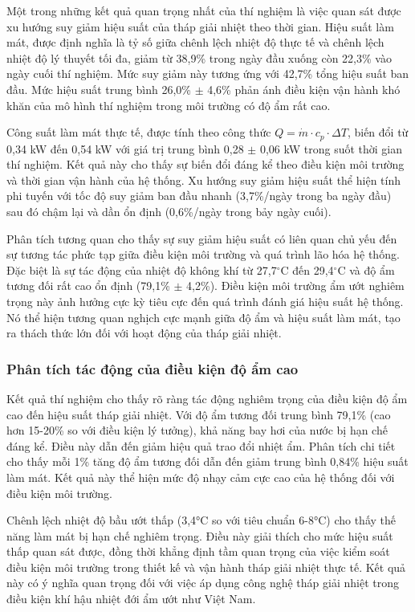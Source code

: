 \documentclass[../main.tex]{subfiles}
\begin{document}
Một trong những kết quả quan trọng nhất của thí nghiệm là việc quan sát được xu hướng suy giảm hiệu suất của tháp giải nhiệt theo thời gian. Hiệu suất làm mát, được định nghĩa là tỷ số giữa chênh lệch nhiệt độ thực tế và chênh lệch nhiệt độ lý thuyết tối đa, giảm từ 38,9\% trong ngày đầu xuống còn 22,3\% vào ngày cuối thí nghiệm. Mức suy giảm này tương ứng với 42,7\% tổng hiệu suất ban đầu. Mức hiệu suất trung bình 26,0\% $\pm$ 4,6\% phản ánh điều kiện vận hành khó khăn của mô hình thí nghiệm trong môi trường có độ ẩm rất cao.

Công suất làm mát thực tế, được tính theo công thức $Q = \dot{m} \cdot c_p \cdot \Delta T$, biến đổi từ 0,34 kW đến 0,54 kW với giá trị trung bình 0,28 $\pm$ 0,06 kW trong suốt thời gian thí nghiệm. Kết quả này cho thấy sự biến đổi đáng kể theo điều kiện môi trường và thời gian vận hành của hệ thống. Xu hướng suy giảm hiệu suất thể hiện tính phi tuyến với tốc độ suy giảm ban đầu nhanh (3,7\%/ngày trong ba ngày đầu) sau đó chậm lại và dần ổn định (0,6\%/ngày trong bảy ngày cuối).

Phân tích tương quan cho thấy sự suy giảm hiệu suất có liên quan chủ yếu đến sự tương tác phức tạp giữa điều kiện môi trường và quá trình lão hóa hệ thống. Đặc biệt là sự tác động của nhiệt độ không khí từ 27,7${^\circ\mathrm{C}}$ đến 29,4${^\circ\mathrm{C}}$ và độ ẩm tương đối rất cao ổn định (79,1\% $\pm$ 4,2\%). Điều kiện môi trường ẩm ướt nghiêm trọng này ảnh hưởng cực kỳ tiêu cực đến quá trình đánh giá hiệu suất hệ thống. Nó thể hiện tương quan nghịch cực mạnh giữa độ ẩm và hiệu suất làm mát, tạo ra thách thức lớn đối với hoạt động của tháp giải nhiệt.

\subsubsection{Phân tích tác động của điều kiện độ ẩm cao}
\label{sec:high_humidity_impact_analysis}

Kết quả thí nghiệm cho thấy rõ ràng tác động nghiêm trọng của điều kiện độ ẩm cao đến hiệu suất tháp giải nhiệt. Với độ ẩm tương đối trung bình 79,1\% (cao hơn 15-20\% so với điều kiện lý tưởng), khả năng bay hơi của nước bị hạn chế đáng kể. Điều này dẫn đến giảm hiệu quả trao đổi nhiệt ẩm. Phân tích chi tiết cho thấy mỗi 1\% tăng độ ẩm tương đối dẫn đến giảm trung bình 0,84\% hiệu suất làm mát. Kết quả này thể hiện mức độ nhạy cảm cực cao của hệ thống đối với điều kiện môi trường.

Chênh lệch nhiệt độ bầu ướt thấp (3,4°C so với tiêu chuẩn 6-8°C) cho thấy thế năng làm mát bị hạn chế nghiêm trọng. Điều này giải thích cho mức hiệu suất thấp quan sát được, đồng thời khẳng định tầm quan trọng của việc kiểm soát điều kiện môi trường trong thiết kế và vận hành tháp giải nhiệt thực tế. Kết quả này có ý nghĩa quan trọng đối với việc áp dụng công nghệ tháp giải nhiệt trong điều kiện khí hậu nhiệt đới ẩm ướt như Việt Nam.
\end{document}
